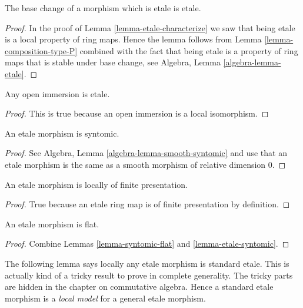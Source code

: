 \begin{lemma}
\label{lemma-base-change-etale}
The base change of a morphism which is etale is etale.
\end{lemma}

\begin{proof}
In the proof of Lemma \ref{lemma-etale-characterize}
we saw that being etale is a local property of ring maps.
Hence the lemma follows from
Lemma \ref{lemma-composition-type-P} combined
with the fact that being etale is a property of ring maps that is
stable under base change, see
Algebra, Lemma \ref{algebra-lemma-etale}.
\end{proof}

\begin{lemma}
\label{lemma-open-immersion-etale}
Any open immersion is etale.
\end{lemma}

\begin{proof}
This is true because an open immersion is a local isomorphism.
\end{proof}

\begin{lemma}
\label{lemma-etale-syntomic}
An etale morphism is syntomic.
\end{lemma}

\begin{proof}
See Algebra, Lemma \ref{algebra-lemma-smooth-syntomic} and use that an
etale morphism is the same as a smooth morphism of relative dimension $0$.
\end{proof}

\begin{lemma}
\label{lemma-etale-locally-finite-presentation}
An etale morphism is locally of finite presentation.
\end{lemma}

\begin{proof}
True because an etale ring map is of finite presentation by
definition.
\end{proof}

\begin{lemma}
\label{lemma-etale-flat}
An etale morphism is flat.
\end{lemma}

\begin{proof}
Combine Lemmas \ref{lemma-syntomic-flat} and \ref{lemma-etale-syntomic}.
\end{proof}

\noindent
The following lemma says locally any etale morphism is standard etale.
This is actually kind of a tricky result to prove in complete generality.
The tricky parts are hidden in the chapter on commutative algebra.
Hence a standard etale morphism is a {\it local model} for a general
etale morphism.

